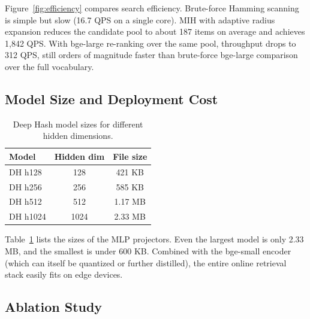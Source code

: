 \documentclass[11pt,a4paper]{article}
\begin{document}
Figure~\ref{fig:efficiency} compares search efficiency. Brute-force Hamming scanning is simple but slow (16.7 QPS on a single core). MIH with adaptive radius expansion reduces the candidate pool to about 187 items on average and achieves 1,842 QPS. With bge-large re-ranking over the same pool, throughput drops to 312 QPS, still orders of magnitude faster than brute-force bge-large comparison over the full vocabulary.

\subsection{Model Size and Deployment Cost}

\begin{table}[htbp]
\centering
\caption{Deep Hash model sizes for different hidden dimensions.}
\label{tab:model-size}
\begin{tabular}{lcc}
\toprule
\textbf{Model} & \textbf{Hidden dim} & \textbf{File size} \\
\midrule
DH h128 & 128 & 421 KB \\
DH h256 & 256 & 585 KB \\
DH h512 & 512 & 1.17 MB \\
DH h1024 & 1024 & 2.33 MB \\
\bottomrule
\end{tabular}
\end{table}

Table~\ref{tab:model-size} lists the sizes of the MLP projectors. Even the largest model is only 2.33 MB, and the smallest is under 600 KB. Combined with the bge-small encoder (which can itself be quantized or further distilled), the entire online retrieval stack easily fits on edge devices.

\subsection{Ablation Study}
\end{document}
